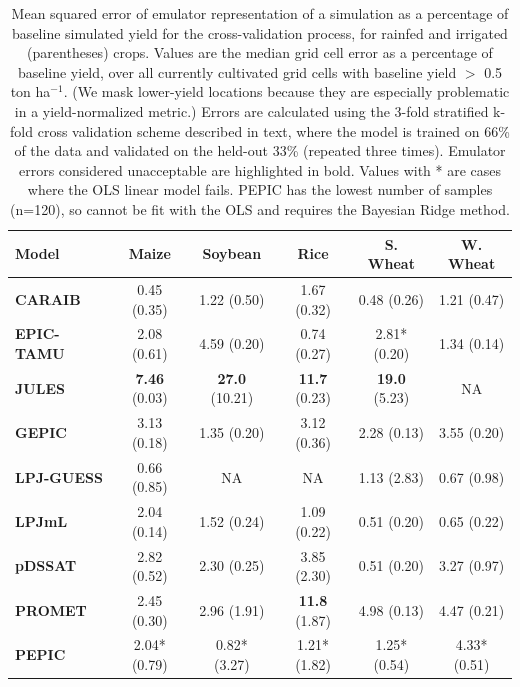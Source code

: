 \documentclass[gmd, manuscript]{copernicus} %
\begin{document}
\begin{table}[hb]
    \caption{
        Mean squared error of emulator representation of a simulation as a percentage of baseline simulated yield for the cross-validation process, for rainfed and irrigated (parentheses) crops. Values are the median grid cell error as a percentage of baseline yield, over all currently cultivated grid cells with baseline yield $>$ 0.5 ton ha$^{-1}$. (We mask lower-yield locations because they are especially problematic in a yield-normalized metric.) %
        Errors are calculated using the 3-fold stratified k-fold cross validation scheme described in text, where the model is trained on 66\% of the data and validated on the held-out 33\% (repeated three times). 
        Emulator errors considered unacceptable are highlighted in bold. 
        Values with * are cases where the OLS linear model fails. PEPIC has the lowest number of samples (n=120), so cannot be fit with the OLS and requires the Bayesian Ridge method.
    } 
    \label{table:ASE}
    \begin{tabular}{l | c | c | c | c | c} 
        \hline
        \textbf{Model}     & \textbf{Maize} & \textbf{Soybean} & \textbf{Rice} & \textbf{S. Wheat} & \textbf{W. Wheat} \\ \hline
        \textbf{CARAIB}    & 0.45 (0.35) & 1.22 (0.50) & 1.67 (0.32) & 0.48 (0.26) & 1.21 (0.47) \\ \hline
        \textbf{EPIC-TAMU} & 2.08 (0.61) & 4.59 (0.20) & 0.74 (0.27) & 2.81* (0.20) & 1.34 (0.14)  \\ \hline
        \textbf{JULES}     & \textbf{7.46} (0.03) & \textbf{27.0} (10.21)& \textbf{11.7} (0.23) & \textbf{19.0} (5.23)  & NA  \\ \hline
        \textbf{GEPIC}     & 3.13 (0.18) & 1.35 (0.20) & 3.12 (0.36) & 2.28 (0.13) & 3.55 (0.20) \\ \hline
        \textbf{LPJ-GUESS} & 0.66 (0.85) & NA    & NA  & 1.13 (2.83) & 0.67 (0.98)  \\ \hline
        \textbf{LPJmL}     & 2.04 (0.14) & 1.52 (0.24) & 1.09 (0.22) & 0.51 (0.20) & 0.65 (0.22)  \\ \hline
        \textbf{pDSSAT}    & 2.82 (0.52) & 2.30 (0.25) & 3.85 (2.30) & 0.51 (0.20) & 3.27 (0.97)  \\ \hline
        \textbf{PROMET}    & 2.45 (0.30) & 2.96 (1.91) & \textbf{11.8} (1.87) & 4.98 (0.13) & 4.47 (0.21)  \\ \hline
        \textbf{PEPIC}     & 2.04* (0.79) & 0.82* (3.27) & 1.21* (1.82) & 1.25* (0.54) & 4.33* (0.51) \\ \hline
    \end{tabular}
\end{table}
\end{document}
